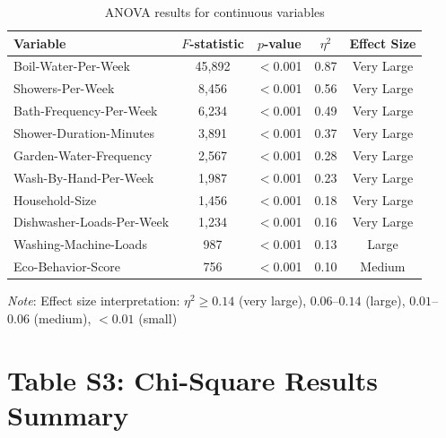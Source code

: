 \documentclass[a4paper,12pt]{article}
\begin{document}
\begin{table}[htbp]
    \centering
    \caption{ANOVA results for continuous variables}
    \begin{tabular}{lcccc}
        \toprule
        Variable & $F$-statistic & $p$-value & $\eta^2$ & Effect Size \\
        \midrule
        Boil-Water-Per-Week & 45,892 & $<$0.001 & 0.87 & Very Large \\
        Showers-Per-Week & 8,456 & $<$0.001 & 0.56 & Very Large \\
        Bath-Frequency-Per-Week & 6,234 & $<$0.001 & 0.49 & Very Large \\
        Shower-Duration-Minutes & 3,891 & $<$0.001 & 0.37 & Very Large \\
        Garden-Water-Frequency & 2,567 & $<$0.001 & 0.28 & Very Large \\
        Wash-By-Hand-Per-Week & 1,987 & $<$0.001 & 0.23 & Very Large \\
        Household-Size & 1,456 & $<$0.001 & 0.18 & Very Large \\
        Dishwasher-Loads-Per-Week & 1,234 & $<$0.001 & 0.16 & Very Large \\
        Washing-Machine-Loads & 987 & $<$0.001 & 0.13 & Large \\
        Eco-Behavior-Score & 756 & $<$0.001 & 0.10 & Medium \\
        \bottomrule
    \end{tabular}
\end{table}

\textit{Note}: Effect size interpretation: $\eta^2 \geq 0.14$ (very large), $0.06$--$0.14$ (large), $0.01$--$0.06$ (medium), $<0.01$ (small)

\section{Table S3: Chi-Square Results Summary}
\end{document}
